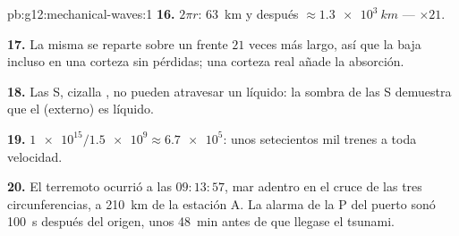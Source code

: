 \begin{solution}{pb:g12:mechanical-waves:1}
\textbf{16.} $2\pi r$: \qty{63}{km} y después
$\approx \qty{1.3e3}{km}$ --- $\times 21$.

\textbf{17.} La misma  se reparte sobre un frente $21$ veces más
largo, así que la  baja incluso en una corteza sin pérdidas; una
corteza real añade la absorción.

\textbf{18.} Las  S, cizalla , no pueden atravesar un
líquido: la sombra de las  S demuestra que el  (externo) es
líquido.

\textbf{19.} $\num{1e15}/\num{1.5e9} \approx \num{6.7e5}$: unos
setecientos mil trenes a toda velocidad.

\textbf{20.} El terremoto ocurrió a las $09{:}13{:}57$, mar adentro en
el cruce de las tres circunferencias, a \qty{210}{km} de la estación A.
La alarma de la  P del puerto sonó \qty{100}{s} después del origen,
unos \qty{48}{min} antes de que llegase el tsunami.
\end{solution}
